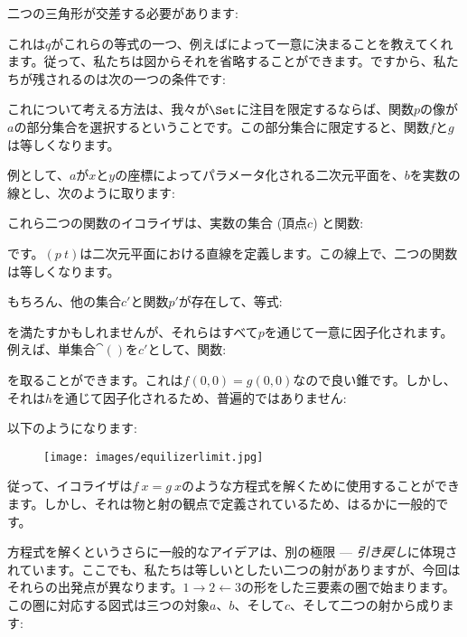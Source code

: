 \noindent
二つの三角形が交差する必要があります: 


これは$q$がこれらの等式の一つ、例えばによって一意に決まることを教えてくれます。従って、私たちは図からそれを省略することができます。ですから、私たちが残されるのは次の一つの条件です: 


これについて考える方法は、我々が$\Set$に注目を限定するならば、関数$p$の像が$a$の部分集合を選択するということです。この部分集合に限定すると、関数$f$と$g$は等しくなります。

例として、$a$が$x$と$y$の座標によってパラメータ化される二次元平面を、$b$を実数の線とし、次のように取ります: 


これら二つの関数のイコライザは、実数の集合 (頂点$c$) と関数: 


です。$(p~t)$は二次元平面における直線を定義します。この線上で、二つの関数は等しくなります。

もちろん、他の集合$c'$と関数$p'$が存在して、等式: 


を満たすかもしれませんが、それらはすべて$p$を通じて一意に因子化されます。例えば、単集合$\cat{()}$を$c'$として、関数: 


を取ることができます。これは$f (0, 0) = g (0, 0)$なので良い錐です。しかし、それは$h$を通じて因子化されるため、普遍的ではありません: 


以下のようになります: 


\begin{figure}[H]
  \centering
  \texttt{[image: images/equilizerlimit.jpg]}
\end{figure}

\noindent
従って、イコライザは$f~x = g~x$のような方程式を解くために使用することができます。しかし、それは物と射の観点で定義されているため、はるかに一般的です。

方程式を解くというさらに一般的なアイデアは、別の極限 --- \emph{引き戻し}に体現されています。ここでも、私たちは等しいとしたい二つの射がありますが、今回はそれらの出発点が異なります。$1\rightarrow2\leftarrow3$の形をした三要素の圏で始まります。この圏に対応する図式は三つの対象$a$、$b$、そして$c$、そして二つの射から成ります: 

